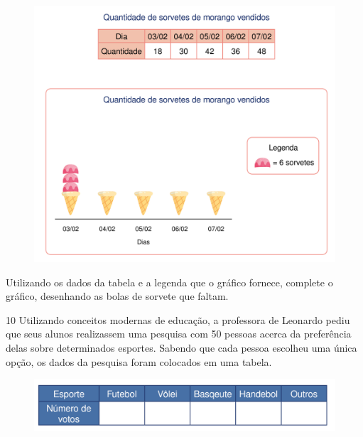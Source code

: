 \begin{figure}[htpb!]
\centering
\includegraphics[width=\textwidth]{./media/image84.png}
\end{figure}

Utilizando os dados da tabela e a legenda que o gráfico fornece,
complete o gráfico, desenhando as bolas de sorvete que faltam.

\pagebreak

\num{10} Utilizando conceitos modernas de educação, a professora de Leonardo
pediu que seus alunos realizassem uma pesquisa com 50 pessoas acerca da
preferência delas sobre determinados esportes. Sabendo que cada pessoa
escolheu uma única opção, os dados da pesquisa foram colocados em uma tabela.

\begin{figure}[htpb!]
\centering
\includegraphics[width=\textwidth]{./media/image85.png}
\end{figure}

